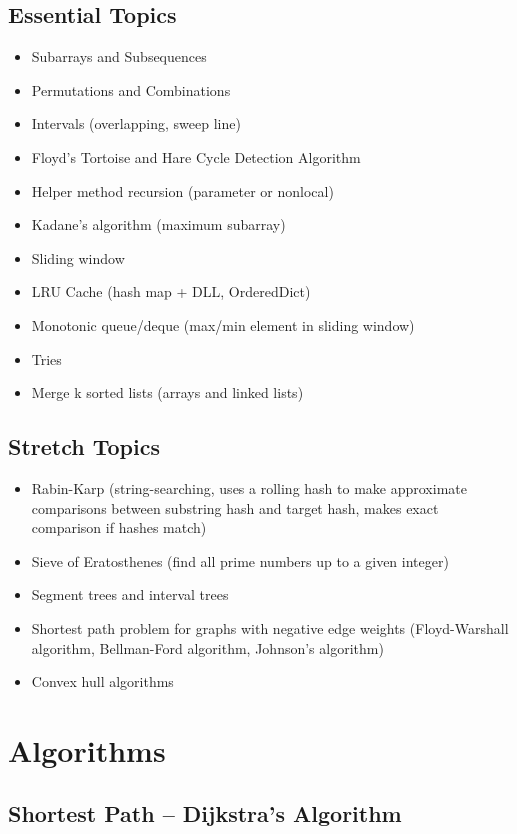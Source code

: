 \documentclass[12pt, titlepage]{article}
\begin{document}
\subsection{Essential Topics}
\begin{itemize}
  \item Subarrays and Subsequences
  \item Permutations and Combinations
  \item Intervals (overlapping, sweep line)
  \item Floyd's Tortoise and Hare Cycle Detection Algorithm
  \item Helper method recursion (parameter or nonlocal)
  \item Kadane's algorithm (maximum subarray)
  \item Sliding window
  \item LRU Cache (hash map + DLL, OrderedDict)
  \item Monotonic queue/deque (max/min element in sliding window) %
  \item Tries
  \item Merge k sorted lists (arrays and linked lists)
\end{itemize}

\subsection{Stretch Topics}
\begin{itemize}
  \item Rabin-Karp (string-searching, uses a rolling hash to make approximate comparisons between substring hash and target hash, makes exact comparison if hashes match)
  \item Sieve of Eratosthenes (find all prime numbers up to a given integer)
  \item Segment trees and interval trees
  \item Shortest path problem for graphs with negative edge weights (Floyd-Warshall algorithm, Bellman-Ford algorithm, Johnson's algorithm)
  \item Convex hull algorithms
\end{itemize}

\newpage
\appendix

\section{Algorithms}

\subsection{Shortest Path -- Dijkstra's Algorithm} \label{dijkstra}
\end{document}
